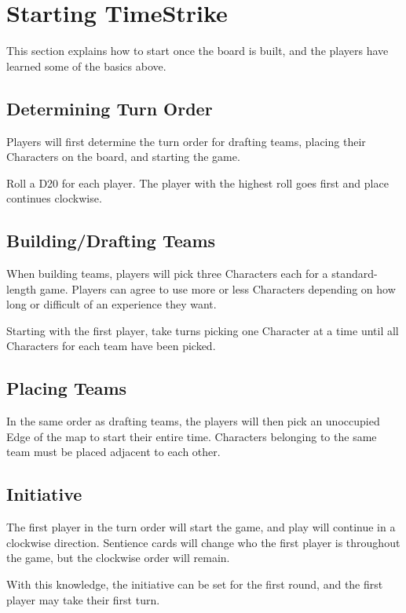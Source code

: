 \documentclass[../main.tex]{subfiles}
\begin{document}
\section{Starting TimeStrike}
This section explains how to start once the board is built, and the players have learned some of the basics above. 

\subsection{Determining Turn Order}
Players will first determine the turn order for drafting teams, placing their Characters on the board, and starting the game. 

Roll a D20 for each player. The player with the highest roll goes first and place continues clockwise. 

\subsection{Building/Drafting Teams}
When building teams, players will pick three Characters each for a standard-length game. Players can agree to use more or less Characters depending on how long or difficult of an experience they want. 

Starting with the first player, take turns picking one Character at a time until all Characters for each team have been picked. 

\subsection{Placing Teams}
In the same order as drafting teams, the players will then pick an unoccupied Edge of the map to start their entire time. Characters belonging to the same team must be placed adjacent to each other. 

\subsection{Initiative}
The first player in the turn order will start the game, and play will continue in a clockwise direction. Sentience cards will change who the first player is throughout the game, but the clockwise order will remain. 

With this knowledge, the initiative can be set for the first round, and the first player may take their first turn. 

\clearpage
\end{document}
